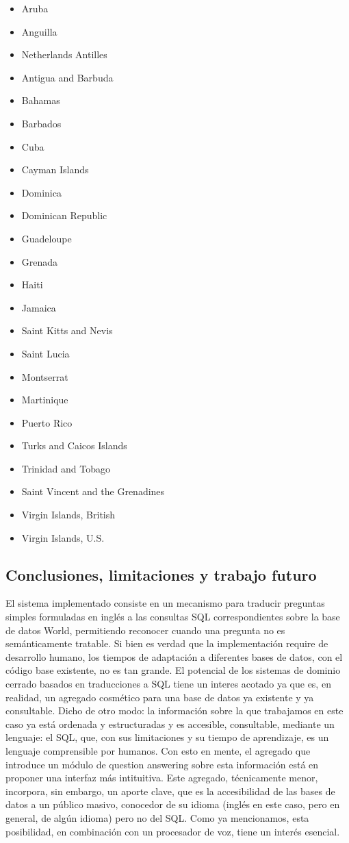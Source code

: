 \begin{itemize}
 \item Aruba
 \item Anguilla
 \item Netherlands Antilles
 \item Antigua and Barbuda
 \item Bahamas
 \item Barbados
 \item Cuba
 \item Cayman Islands
 \item Dominica
 \item Dominican Republic
 \item Guadeloupe
 \item Grenada
 \item Haiti
 \item Jamaica
 \item Saint Kitts and Nevis
 \item Saint Lucia
 \item Montserrat
 \item Martinique
 \item Puerto Rico
 \item Turks and Caicos Islands
 \item Trinidad and Tobago
 \item Saint Vincent and the Grenadines
 \item Virgin Islands, British
 \item Virgin Islands, U.S.
\end{itemize}


\subsection{Conclusiones, limitaciones y trabajo futuro}
\label{subsec:popescu-cierre}

El sistema implementado consiste en un mecanismo para traducir preguntas simples formuladas en inglés a las consultas SQL correspondientes sobre la base de datos World, permitiendo reconocer cuando una pregunta no es semánticamente tratable. Si bien es verdad que la implementación require de desarrollo humano, los tiempos de adaptación a diferentes bases de datos, con el código base existente, no es tan grande. El potencial de los sistemas de dominio cerrado basados en traducciones a SQL tiene un interes acotado ya que es, en realidad, un agregado cosmético para una base de datos ya existente y ya consultable. Dicho de otro modo: la información sobre la que trabajamos en este caso ya está ordenada y estructuradas y es accesible, consultable, mediante un lenguaje: el SQL, que, con sus limitaciones y su tiempo de aprendizaje, es un lenguaje comprensible por humanos. Con esto en mente, el agregado que introduce un módulo de question answering sobre esta información está en proponer una interfaz más intituitiva. Este agregado, técnicamente menor, incorpora, sin embargo, un aporte clave, que es la accesibilidad de las bases de datos a un público masivo, conocedor de su idioma (inglés en este caso, pero en general, de algún idioma) pero no del SQL. Como ya mencionamos, esta posibilidad, en combinación con un procesador de voz, tiene un interés esencial.

